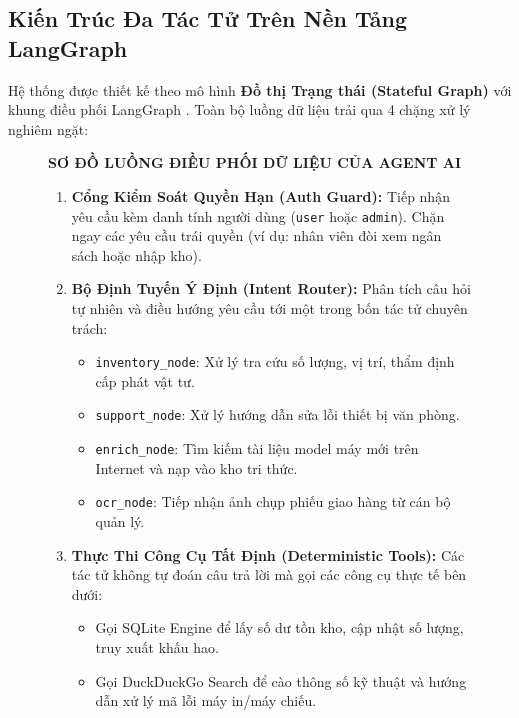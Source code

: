 \documentclass[11pt,a4paper]{article}
\begin{document}
\subsection{Kiến Trúc Đa Tác Tử Trên Nền Tảng LangGraph}
Hệ thống được thiết kế theo mô hình \textbf{Đồ thị Trạng thái (Stateful Graph)} với khung điều phối LangGraph \cite{langgraph2024}. Toàn bộ luồng dữ liệu trải qua 4 chặng xử lý nghiêm ngặt:

\begin{figure}[H]
\centering
\small
\begin{tcolorbox}[colback=white,colframe=NavyHust,sharp corners,boxrule=1pt]
\begin{center}
\textbf{SƠ ĐỒ LUỒNG ĐIỀU PHỐI DỮ LIỆU CỦA AGENT AI}
\end{center}
\vspace{0.2cm}
\begin{enumerate}[leftmargin=2.0em, itemsep=6pt]
    \item[\textbf{[Chặng 1]}] \textbf{Cổng Kiểm Soát Quyền Hạn (Auth Guard):} Tiếp nhận yêu cầu kèm danh tính người dùng (\texttt{user} hoặc \texttt{admin}). Chặn ngay các yêu cầu trái quyền (ví dụ: nhân viên đòi xem ngân sách hoặc nhập kho).
    \item[\textbf{[Chặng 2]}] \textbf{Bộ Định Tuyến Ý Định (Intent Router):} Phân tích câu hỏi tự nhiên và điều hướng yêu cầu tới một trong bốn tác tử chuyên trách:
    \begin{itemize}[leftmargin=1.2em, itemsep=2pt]
        \item \texttt{inventory\_node}: Xử lý tra cứu số lượng, vị trí, thẩm định cấp phát vật tư.
        \item \texttt{support\_node}: Xử lý hướng dẫn sửa lỗi thiết bị văn phòng.
        \item \texttt{enrich\_node}: Tìm kiếm tài liệu model máy mới trên Internet và nạp vào kho tri thức.
        \item \texttt{ocr\_node}: Tiếp nhận ảnh chụp phiếu giao hàng từ cán bộ quản lý.
    \end{itemize}
    \item[\textbf{[Chặng 3]}] \textbf{Thực Thi Công Cụ Tất Định (Deterministic Tools):} Các tác tử không tự đoán câu trả lời mà gọi các công cụ thực tế bên dưới:
    \begin{itemize}[leftmargin=1.2em, itemsep=2pt]
        \item Gọi SQLite Engine để lấy số dư tồn kho, cập nhật số lượng, truy xuất khấu hao.
        \item Gọi DuckDuckGo Search để cào thông số kỹ thuật và hướng dẫn xử lý mã lỗi máy in/máy chiếu.

\end{itemize}
\end{enumerate}
\end{tcolorbox}
\end{figure}
\end{document}
